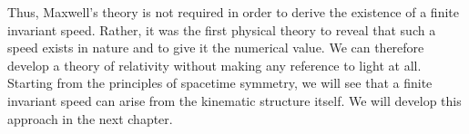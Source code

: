 		Thus, Maxwell's theory is not required in order to derive the existence of a
		finite invariant speed. Rather, it was the first physical theory to reveal
		that such a speed exists in nature and to give it the numerical value.
		We can therefore develop a theory of relativity without making any reference
		to light at all. Starting from the principles of spacetime symmetry, we will
		see that a finite invariant speed can arise from the kinematic structure
		itself. We will develop this approach in the next chapter.















